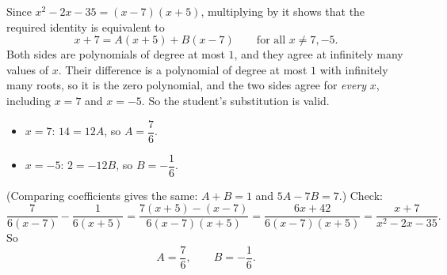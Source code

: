 Since $x^2-2x-35=(x-7)(x+5)$, multiplying by it shows that the required identity is equivalent to
\[x+7=A(x+5)+B(x-7)\qquad\text{for all }x\ne7,-5 .\]
Both sides are polynomials of degree at most $1$, and they agree at infinitely many values of $x$. Their difference is a polynomial of degree at most $1$ with infinitely many roots, so it is the zero polynomial, and the two sides agree for \emph{every} $x$, including $x=7$ and $x=-5$. So the student's substitution is valid.
\begin{itemize}
\item $x=7$: $14=12A$, so $A=\dfrac{7}{6}$.
\item $x=-5$: $2=-12B$, so $B=-\dfrac{1}{6}$.
\end{itemize}
(Comparing coefficients gives the same: $A+B=1$ and $5A-7B=7$.) Check:
\[\dfrac{7}{6(x-7)}-\dfrac{1}{6(x+5)}=\dfrac{7(x+5)-(x-7)}{6(x-7)(x+5)}=\dfrac{6x+42}{6(x-7)(x+5)}=\dfrac{x+7}{x^2-2x-35}.\]
So
\[\boxed{A=\dfrac{7}{6},\qquad B=-\dfrac{1}{6}}.\]

